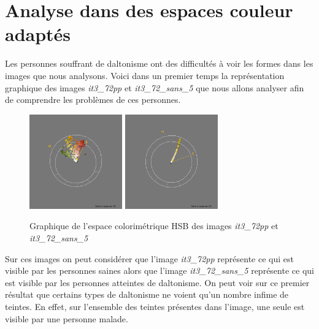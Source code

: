 \documentclass[a4paper,10pt]{article}
\begin{document}
\section{Analyse dans des espaces couleur adaptés}
Les personnes souffrant de daltonisme ont des difficultés à voir les formes dans les images que nous analysons. 
Voici dans un premier temps la représentation graphique des images \textit{it3\_72pp} et \textit{it3\_72\_sans\_5} que nous
allons analyser afin de comprendre les problèmes de ces personnes.
\begin{figure}[!h]
 \begin{center}
 \includegraphics[width=4cm]{resultat/compare1_1.png}
 \includegraphics[width=4cm]{resultat/compare1_2.png}
 \caption{Graphique de l'espace colorimétrique HSB des images \textit{it3\_72pp} et \textit{it3\_72\_sans\_5}}
 \end{center}
\end{figure}

Sur ces images on peut considérer que l'image \textit{it3\_72pp} représente ce qui est visible par les personnes saines alors
que l'image \textit{it3\_72\_sans\_5} représente ce qui est visible par les personnes atteintes de daltonisme.
On peut voir sur ce premier résultat que certains types de daltonisme ne voient qu'un nombre infime de teintes. En effet, sur 
l'ensemble des teintes présentes dans l'image, une seule est visible par une personne malade.
\end{document}
